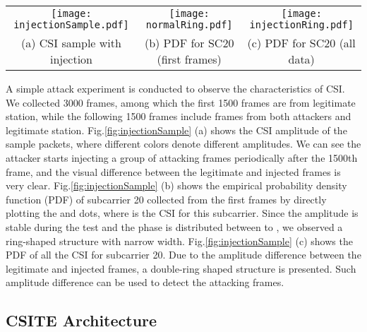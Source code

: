 \documentclass[conference]{IEEEtran}
\begin{document}
\begin{figure*}[!t]
\begin{center}
\begin{tabular}{ccc}
\texttt{[image: injectionSample.pdf]} \hspace{-0.3in} &
\texttt{[image: normalRing.pdf]} \hspace{-0.4in} &
\texttt{[image: injectionRing.pdf]} \\
(a) CSI sample with injection & (b) PDF for SC20 (first  frames) &
(c) PDF for SC20 (all data)
\end{tabular}
\end{center}
\caption{(a) Amplitude of CSI sample where warmer
  colors denote larger amplitudes. Attacking frames are injected
  starting from frame number .
(b)  PDF  for sub-carrier 20 of the first 
   frames, where the value (denoted by colors) at a point is the
   number of frames with this CSI.
 (c)  PDF for  sub-carrier 20 of all samples, including attacking
   frames.}
\label{fig:injectionSample}
\vspace{-0.15in}
\end{figure*}

A simple attack experiment is conducted to observe the characteristics of CSI.
We collected 3000 frames, among which the first 1500 frames are from legitimate station, while the following 1500 frames include frames
 from both attackers and legitimate station. Fig.\ref{fig:injectionSample} (a) shows the
 CSI amplitude of the sample packets, where different colors denote
different amplitudes. We can see the attacker starts
injecting a group of attacking frames periodically after the 1500th frame, and the visual
difference between the legitimate and injected frames is very clear.
Fig.\ref{fig:injectionSample} (b) shows the empirical probability density function (PDF) of subcarrier 20 collected from the first  frames by directly plotting the  and  dots, where
  is the CSI for this subcarrier. Since the amplitude is stable during the test
 and the phase is distributed between  to , we observed a ring-shaped structure with narrow width. Fig.\ref{fig:injectionSample} (c) shows the PDF of all the CSI for subcarrier 20. Due to the amplitude difference between the legitimate and injected frames, a double-ring shaped structure is presented. Such amplitude difference can be used to detect the attacking frames.


\subsection{CSITE Architecture}
\label{subsec:working-model}
\end{document}

